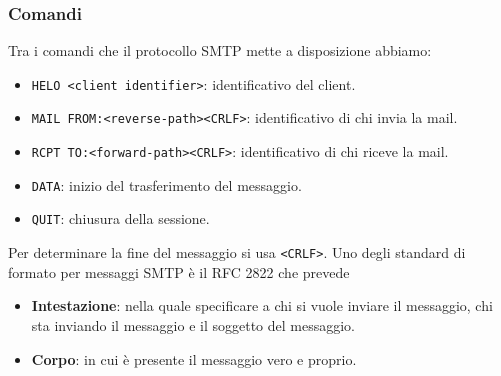 \subsubsection{Comandi}
Tra i comandi che il protocollo SMTP mette a disposizione abbiamo:
\begin{itemize}
	\item \verb|HELO <client identifier>|: identificativo del client.
	\item \verb|MAIL FROM:<reverse-path><CRLF>|: identificativo di chi invia la mail.
	\item \verb|RCPT TO:<forward-path><CRLF>|: identificativo di chi riceve la mail.
	\item \verb|DATA|: inizio del trasferimento del messaggio.
	\item \verb|QUIT|: chiusura della sessione.
\end{itemize}
Per determinare la fine del messaggio si usa \verb|<CRLF>|. Uno degli standard di formato per
messaggi SMTP è il RFC 2822 che prevede
\begin{itemize}
	\item \textbf{Intestazione}: nella quale specificare a chi si vuole inviare il messaggio, chi
		sta inviando il messaggio e il soggetto del messaggio.
	\item \textbf{Corpo}: in cui è presente il messaggio vero e proprio.
\end{itemize}

